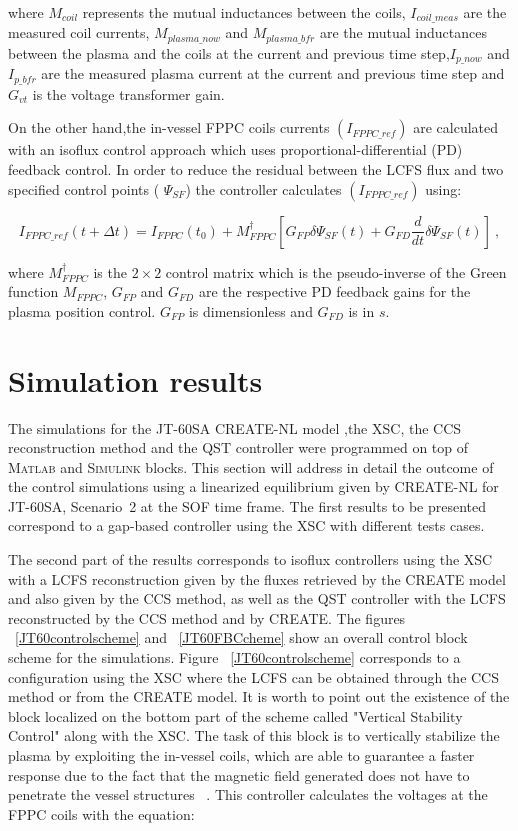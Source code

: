 where $M_{coil} $ represents the mutual inductances between the coils, $I_{coil\_meas}  $ are the measured coil currents,  $M_{plasma\_now}$ and $ M_{plasma\_ bfr}$ are the mutual inductances between the plasma and the coils at the current and previous time step,$  I_{p\_now} $  and  $ I_{p\_bfr} $ are the measured plasma current at the current and previous time step  and $ G_{vt} $ is the voltage transformer gain.
\smallskip

On the other hand,the in-vessel FPPC coils currents $ (I_{FPPC\_ref})  $ are calculated with an isoflux control approach which uses proportional-differential (PD) feedback control. In order to reduce  the residual between the LCFS flux and two specified control points ( $ \Psi_{SF} $)  the controller calculates  $ (I_{FPPC\_ref})  $ using:

\begin{equation}
I_{FPPC\_ref}(t+\Delta t)=I_{FPPC}(t_0)+ M^\dagger_{FPPC}\left[G_{FP}\delta \Psi_{SF}(t) + G_{FD}\frac{d}{dt}\delta\Psi_{SF}(t) \right] ~,
\end{equation}

where $ M^\dagger_{FPPC}$ is the $ 2 \times 2$ control matrix which is the pseudo-inverse of the Green function $M_{FPPC}$, $ G_{FP} $ and $ G_{FD} $
are the respective PD feedback gains for the plasma position control. $ G_{FP} $ is dimensionless and $ G_{FD} $ is in $s$.



\section{Simulation results}	

 The simulations for  the JT-60SA CREATE-NL model ,the XSC, the CCS reconstruction method and the QST controller  were programmed on top of  \textsc{Matlab} and \textsc{Simulink} blocks. This  section will address in detail the outcome of the control simulations using a linearized equilibrium given by CREATE-NL for JT-60SA, Scenario~2 at the SOF time frame. The first results to be presented correspond to a  gap-based controller  using the XSC with different tests cases.
 \smallskip
 
 
 The second part of the results corresponds to isoflux controllers using the XSC  with a LCFS reconstruction given by the fluxes retrieved by the CREATE model and also given by the CCS method, as well as the QST controller with the LCFS reconstructed by the CCS method and by CREATE. The figures ~\ref{JT60controlscheme} and ~\ref{JT60FBCcheme} show an overall control block scheme for the simulations.   Figure ~\ref{JT60controlscheme} corresponds to a configuration using the XSC where the LCFS can be obtained through the CCS method or from the CREATE model. It is worth to point out the existence of the block localized on the bottom part of the scheme called "Vertical Stability Control" along with the XSC. The task of this block is to vertically stabilize the plasma by exploiting the in-vessel coils, which are able to guarantee a faster response due to the fact that the magnetic field generated does not have to penetrate the vessel structures  ~\cite{NCruz}. This controller calculates the voltages at the FPPC coils with the equation:
 
